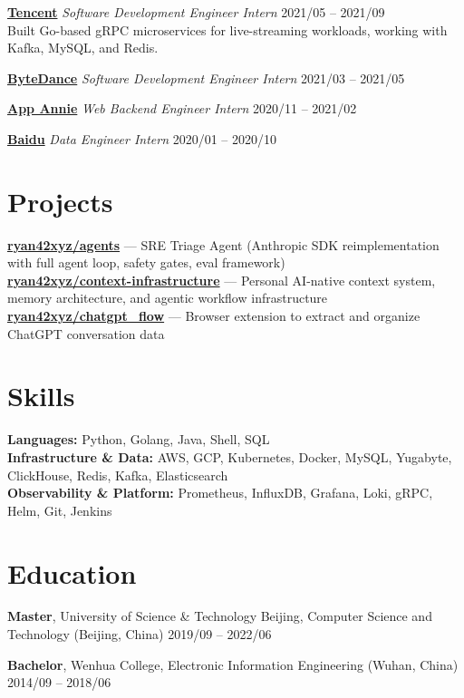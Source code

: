 \documentclass[11pt,a4paper]{article}
\newcommand{\company}[1]{{\large\textcolor{CompanyColor}{\textbf{#1}}}}
\begin{document}
\noindent
\href{https://www.tencent.com}{\company{Tencent}} \hfill \textit{Software Development Engineer Intern} \hfill 2021/05 -- 2021/09 \\
Built Go-based gRPC microservices for live-streaming workloads, working with Kafka, MySQL, and Redis.

\vspace{2pt}
\noindent
\href{https://www.bytedance.com}{\company{ByteDance}} \hfill \textit{Software Development Engineer Intern} \hfill 2021/03 -- 2021/05

\vspace{1pt}
\noindent
\href{https://www.data.ai}{\company{App Annie}} \hfill \textit{Web Backend Engineer Intern} \hfill 2020/11 -- 2021/02

\vspace{0pt}
\noindent
\href{https://www.baidu.com}{\company{Baidu}} \hfill \textit{Data Engineer Intern} \hfill 2020/01 -- 2020/10

\section*{Projects}
\noindent
\href{https://github.com/ryan42xyz/agents}{\textbf{ryan42xyz/agents}} --- SRE Triage Agent (Anthropic SDK reimplementation with full agent loop, safety gates, eval framework) \\
\href{https://github.com/ryan42xyz/context-infrastructure}{\textbf{ryan42xyz/context-infrastructure}} --- Personal AI-native context system, memory architecture, and agentic workflow infrastructure \\
\href{https://github.com/ryan42xyz/chatgpt_flow}{\textbf{ryan42xyz/chatgpt\_flow}} --- Browser extension to extract and organize ChatGPT conversation data

\section*{Skills}
\textbf{Languages:} Python, Golang, Java, Shell, SQL \\
\textbf{Infrastructure \& Data:} AWS, GCP, Kubernetes, Docker, MySQL, Yugabyte, ClickHouse, Redis, Kafka, Elasticsearch \\
\textbf{Observability \& Platform:} Prometheus, InfluxDB, Grafana, Loki, gRPC, Helm, Git, Jenkins

\section*{Education}
\textbf{Master}, {\small University of Science \& Technology Beijing, Computer Science and Technology (Beijing, China)} \hfill {\small 2019/09 -- 2022/06}

\vspace{4pt}
\noindent
\textbf{Bachelor}, {\small Wenhua College, Electronic Information Engineering (Wuhan, China)} \hfill {\small 2014/09 -- 2018/06}
\end{document}
